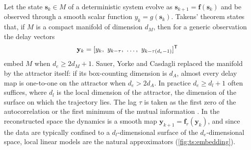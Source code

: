 Let the state $\mathbf{s}_k\in M$ of a deterministic system evolve as $\mathbf{s}_{k+1}=\mathbf{f}(\mathbf{s}_k)$ and be observed through a smooth scalar function $y_k=g(\mathbf{s}_k)$. Takens' theorem \cite{takens:1981} states that, if $M$ is a compact manifold of dimension $d_M$, then for a generic observation the delay vectors
\begin{equation}
  \mathbf{y}_k=[y_k,\ y_{k-\tau},\ \dots,\ y_{k-\tau(d_e-1)}]\T
  \label{eq:ts:delay}
\end{equation}
embed $M$ when $d_e\ge2d_M+1$. Sauer, Yorke and Casdagli \cite{sauer:1991:embedology} replaced the manifold by the attractor itself: if its box-counting dimension is $d_A$, almost every delay map is one-to-one on the attractor when $d_e>2d_A$. In practice $d_e\ge d_l+1$ often suffices, where $d_l$ is the local dimension of the attractor, the dimension of the surface on which the trajectory lies. The lag $\tau$ is taken as the first zero of the autocorrelation or the first minimum of the mutual information \cite{fraser:1986:mutualinfo}. In the reconstructed space the dynamics is a smooth map $\mathbf{y}_{k+1}=\mathbf{f}_r(\mathbf{y}_k)$, and since the data are typically confined to a $d_l$-dimensional surface of the $d_e$-dimensional space, local linear models \cite{farmer:1987:prediction,casdagli:1989:prediction} are the natural approximators (\cref{fig:ts:embedding}).

